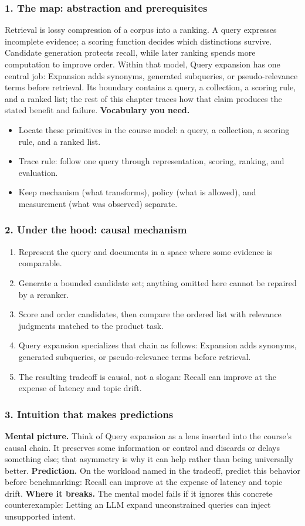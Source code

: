 \subsubsection*{1. The map: abstraction and prerequisites}
Retrieval is lossy compression of a corpus into a ranking. A query expresses incomplete evidence; a scoring function decides which distinctions survive. Candidate generation protects recall, while later ranking spends more computation to improve order.
Within that model, Query expansion has one central job: Expansion adds synonyms, generated subqueries, or pseudo-relevance terms before retrieval. Its boundary contains a query, a collection, a scoring rule, and a ranked list; the rest of this chapter traces how that claim produces the stated benefit and failure.
\textbf{Vocabulary you need.}\begin{itemize}
\item Locate these primitives in the course model: a query, a collection, a scoring rule, and a ranked list.
\item Trace rule: follow one query through representation, scoring, ranking, and evaluation.
\item Keep mechanism (what transforms), policy (what is allowed), and measurement (what was observed) separate.
\end{itemize}
\subsubsection*{2. Under the hood: causal mechanism}\begin{enumerate}
\item Represent the query and documents in a space where some evidence is comparable.
\item Generate a bounded candidate set; anything omitted here cannot be repaired by a reranker.
\item Score and order candidates, then compare the ordered list with relevance judgments matched to the product task.
\item Query expansion specializes that chain as follows: Expansion adds synonyms, generated subqueries, or pseudo-relevance terms before retrieval.
\item The resulting tradeoff is causal, not a slogan: Recall can improve at the expense of latency and topic drift.
\end{enumerate}
\subsubsection*{3. Intuition that makes predictions}
\textbf{Mental picture.} Think of Query expansion as a lens inserted into the course's causal chain. It preserves some information or control and discards or delays something else; that asymmetry is why it can help rather than being universally better.
\textbf{Prediction.} On the workload named in the tradeoff, predict this behavior before benchmarking: Recall can improve at the expense of latency and topic drift.
\textbf{Where it breaks.} The mental model fails if it ignores this concrete counterexample: Letting an LLM expand unconstrained queries can inject unsupported intent.
